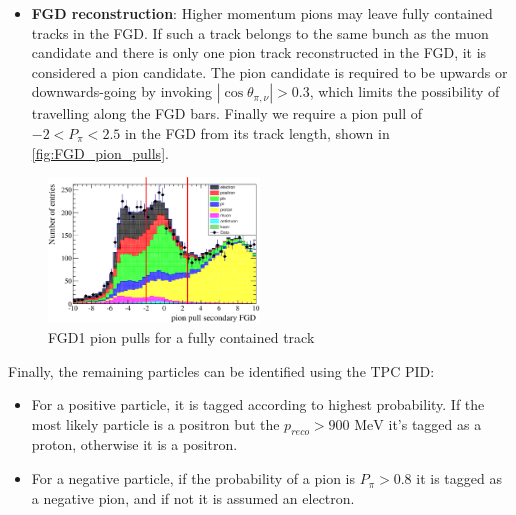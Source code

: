 \begin{itemize}
\begin{itemize}
		\item \textbf{FGD reconstruction}: Higher momentum pions may leave fully contained tracks in the FGD. If such a track belongs to the same bunch as the muon candidate and there is only one pion track reconstructed in the FGD, it is considered a pion candidate. The pion candidate is required to be upwards or downwards-going by invoking $|\cos\theta_{\pi,\nu}| > 0.3$, which limits the possibility of travelling along the FGD bars. Finally we require a pion pull of $-2 < P_\pi < 2.5$ in the FGD from its track length, shown in \autoref{fig:FGD_pion_pulls}.
	\end{itemize}
\end{itemize}
\begin{figure}[h]
	\includegraphics[width=0.5\textwidth]{figures/numu/Cuts/pull_secondarytrack_FGD_all.eps}
	\caption{FGD1 pion pulls for a fully contained track}
	\label{fig:FGD_pion_pulls}
\end{figure}

Finally, the remaining particles can be identified using the TPC PID: 
\begin{itemize}
	\item For a positive particle, it is tagged according to highest probability. If the most likely particle is a positron but the $p_{reco} > 900\text{ MeV}$ it's tagged as a proton, otherwise it is a positron.
	
	\item For a negative particle, if the probability of a pion is $P_\pi>0.8$ it is tagged as a negative pion, and if not it is assumed an electron.
\end{itemize}

